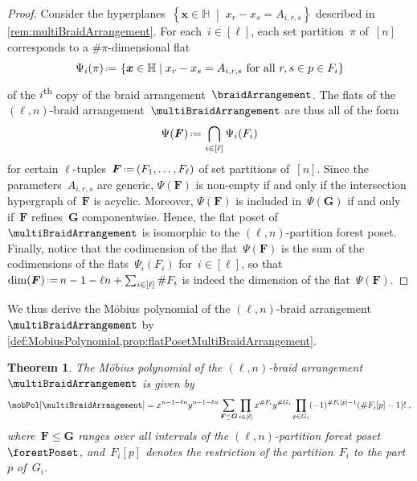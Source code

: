 \documentclass{amsart}
\newtheorem{theorem}{Theorem}[section]
\theoremstyle{definition}
\renewcommand{\b}[1]{{\boldsymbol{#1}}} %
\newcommand{\set}[2]{\left\{ #1 \;\middle|\; #2 \right\}} %
\newcommand{\eqdef}{\mbox{\,\raisebox{0.2ex}{\scriptsize\ensuremath{\mathrm:}}\ensuremath{=}\,}} %
\newcommand{\ordinal}{\textsuperscript{th}} %
\renewcommand{\b}[1]{\boldsymbol{#1}} %
\newcommand{\HH}{\mathbb{H}} %
\begin{document}
\begin{proof}
Consider the hyperplanes~$\set{\b{x} \in \HH}{x_r - x_s = A_{i,r,s}}$ described in \cref{rem:multiBraidArrangement}.
For each~${i \in [\ell]}$, each set partition~$\pi$ of~$[n]$ corresponds to a $\#\pi$-dimensional flat
\[
\Psi_i(\pi) \eqdef \set{\b{x} \in \HH}{x_r - x_s = A_{i,r,s} \text{ for all } r,s \in p \in F_i }
\]
of the $i$\ordinal{} copy of the braid arrangement~$\braidArrangement$.
The flats of the $(\ell,n)$-braid arrangement~$\multiBraidArrangement$ are thus all of the form
\[
\Psi(\b{F}) \eqdef \bigcap_{i \in [\ell]} \Psi_i(F_i)
\]
for certain $\ell$-tuples~$\b{F} \eqdef (F_1, \dots, F_\ell)$ of set partitions of~$[n]$.
Since the parameters~$A_{i,r,s}$ are generic, $\Psi(\b{F})$ is non-empty if and only if the intersection hypergraph of~$\b{F}$ is acyclic.
Moreover, $\Psi(\b{F})$ is included in~$\Psi(\b{G})$ if and only if~$\b{F}$ refines~$\b{G}$ componentwise.
Hence, the flat poset of~$\multiBraidArrangement$ is isomorphic to the $(\ell,n)$-partition forest poset.
Finally, notice that the codimension of the flat~$\Psi(\b{F})$ is the sum of the codimensions of the flats~$\Psi_i(F_i)$ for~$i \in [\ell]$, so that~$\dim(\b{F}) \eqdef n - 1 - \ell n + \sum_{i \in [\ell]} \#F_i $ is indeed the dimension of the flat~$\Psi(\b{F})$.
\end{proof}

We thus derive the M\"obius polynomial of the $(\ell,n)$-braid arrangement~$\multiBraidArrangement$ by \cref{def:MobiusPolynomial,prop:flatPosetMultiBraidArrangement}.

\begin{theorem}
\label{thm:MobiusPolynomialMultiBraidArrangement}
The M\"obius polynomial of the $(\ell,n)$-braid arrangement~$\multiBraidArrangement$ is given by
\[
\mobPol[\multiBraidArrangement] = x^{n-1-\ell n} y^{n-1-\ell n} \sum_{\b{F} \le \b{G}} \prod_{i \in [\ell]} x^{\#F_i} y^{\#G_i} \prod_{p \in G_i} (-1)^{\#F_i[p]-1} (\# F_i[p]-1)! \; ,
\]
where~$\b{F} \le \b{G}$ ranges over all intervals of the $(\ell,n)$-partition forest poset~$\forestPoset$, and~$F_i[p]$ denotes the restriction of the partition~$F_i$ to the part~$p$ of~$G_i$.
\end{theorem}
\end{document}
